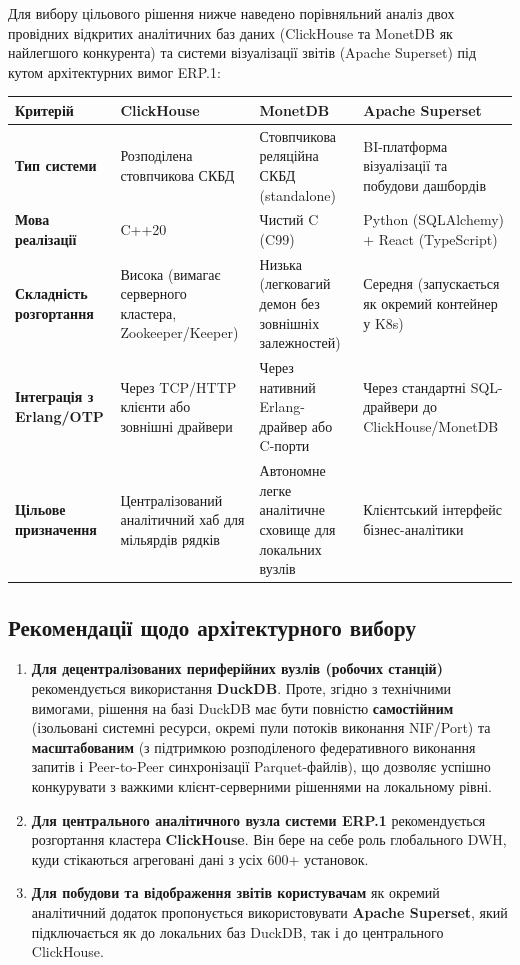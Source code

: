 \documentclass{article}
\begin{document}
Для вибору цільового рішення нижче наведено порівняльний аналіз двох провідних відкритих аналітичних баз даних (ClickHouse та MonetDB як найлегшого конкурента) та системи візуалізації звітів (Apache Superset) під кутом архітектурних вимог ERP.1:

\begin{longtable}{p{3cm} p{3.5cm} p{3.5cm} p{4cm}}
\toprule
\textbf{Критерій} & \textbf{ClickHouse} & \textbf{MonetDB} & \textbf{Apache Superset} \\
\midrule
\textbf{Тип системи} & Розподілена стовпчикова СКБД & Стовпчикова реляційна СКБД (standalone) & BI-платформа візуалізації та побудови дашбордів \\
\midrule
\textbf{Мова реалізації} & C++20 & Чистий C (C99) & Python (SQLAlchemy) + React (TypeScript) \\
\midrule
\textbf{Складність розгортання} & Висока (вимагає серверного кластера, Zookeeper/Keeper) & Низька (легковагий демон без зовнішніх залежностей) & Середня (запускається як окремий контейнер у K8s) \\
\midrule
\textbf{Інтеграція з Erlang/OTP} & Через TCP/HTTP клієнти або зовнішні драйвери & Через нативний Erlang-драйвер або C-порти & Через стандартні SQL-драйвери до ClickHouse/MonetDB \\
\midrule
\textbf{Цільове призначення} & Централізований аналітичний хаб для мільярдів рядків & Автономне легке аналітичне сховище для локальних вузлів & Клієнтський інтерфейс бізнес-аналітики \\
\bottomrule
\end{longtable}

\subsection{Рекомендації щодо архітектурного вибору}
\begin{enumerate}
    \item \textbf{Для децентралізованих периферійних вузлів (робочих станцій)} рекомендується використання \textbf{DuckDB}. Проте, згідно з технічними вимогами, рішення на базі DuckDB має бути повністю \textbf{самостійним} (ізольовані системні ресурси, окремі пули потоків виконання NIF/Port) та \textbf{масштабованим} (з підтримкою розподіленого федеративного виконання запитів і Peer-to-Peer синхронізації Parquet-файлів), що дозволяє успішно конкурувати з важкими клієнт-серверними рішеннями на локальному рівні.
    \item \textbf{Для центрального аналітичного вузла системи ERP.1} рекомендується розгортання кластера \textbf{ClickHouse}. Він бере на себе роль глобального DWH, куди стікаються агреговані дані з усіх 600+ установок.
    \item \textbf{Для побудови та відображення звітів користувачам} як окремий аналітичний додаток пропонується використовувати \textbf{Apache Superset}, який підключається як до локальних баз DuckDB, так і до центрального ClickHouse.
\end{enumerate}
\end{document}
